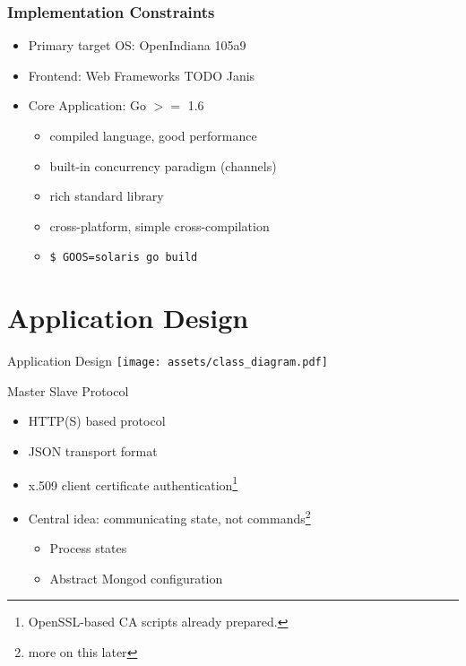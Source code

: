 \documentclass[11pt,aspectratio=169]{beamer}
\begin{document}
    \begin{frame}
        \frametitle{Implementation Constraints}
        \begin{itemize}
            \item<2-> Primary target OS: OpenIndiana 105a9
            \item<3-> Frontend: Web Frameworks TODO Janis %
            \item<4-> Core Application: Go $>=$ 1.6
            \begin{itemize}
                \item<5-> compiled language, good performance
                \item<6-> built-in concurrency paradigm (channels)
                \item<7-> rich standard library
                \item<8-> cross-platform, simple cross-compilation 
                \item<9->\texttt{\$ GOOS=solaris go build}
            \end{itemize}
        \end{itemize}
        
    \end{frame}
        
   
    
    \section{Application Design}
    
    \begin{frame}[label=appdesign]{Application Design}
          \texttt{[image: assets/class\_diagram.pdf]}
    \end{frame}
       
   \begin{frame}{Master Slave Protocol}
       \begin{itemize}
           \item HTTP(S) based protocol
           \item JSON transport format
           \item x.509 client certificate authentication\footnote{OpenSSL-based CA scripts already prepared.}
           \item Central idea: communicating state, not commands\footnote{more on this later}
           \begin{itemize}
               \item Process states
               \item Abstract Mongod configuration
            \end{itemize}
        \end{itemize}
    \end{frame}
    
\end{document}
